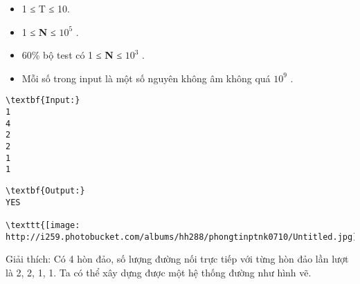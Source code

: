 \begin{itemize}
	\item 1 ≤ T ≤ 10.
	\item 1 ≤ \textbf{ N } ≤ $10^{5}$ .
	\item 60\% bộ test có 1 ≤ \textbf{ N } ≤ $10^{3}$ .
	\item Mỗi số trong input là một số nguyên không âm không quá $10^{9}$ .
\end{itemize}
\begin{verbatim}
\textbf{Input:}
1
4
2
2
1
1\end{verbatim}
\begin{verbatim}
\textbf{Output:}
YES

\texttt{[image: http://i259.photobucket.com/albums/hh288/phongtinptnk0710/Untitled.jpg]}\end{verbatim}

Giải thích: Có 4 hòn đảo, số lượng đường nối trực tiếp với từng hòn đảo lần lượt là 2, 2, 1, 1. Ta có thể xây dựng được một hệ thống đường như hình vẽ.